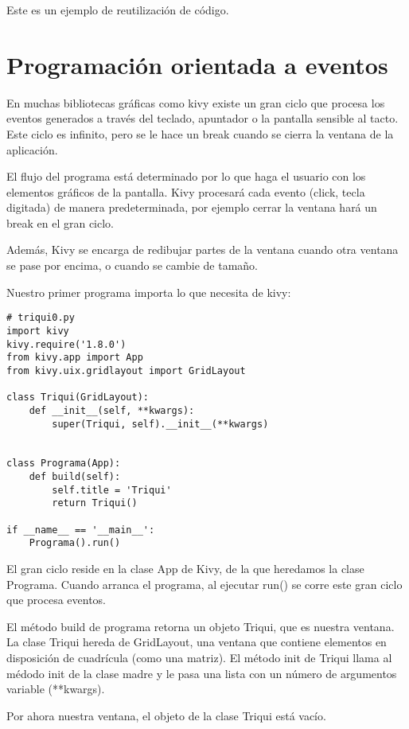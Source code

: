 Este es un ejemplo de reutilización de código.

\section{Programación orientada a eventos}

En muchas bibliotecas gráficas como kivy existe un gran ciclo que procesa
los eventos generados a través del teclado, apuntador o la pantalla
sensible al tacto. Este ciclo es infinito, pero se le hace un break
cuando se cierra la ventana de la aplicación.



El flujo del programa está determinado por lo que haga el usuario con
los elementos gráficos de la pantalla. Kivy procesará cada evento (click,
tecla digitada) de manera predeterminada, por ejemplo cerrar la
ventana hará un break en el gran ciclo.

Además, Kivy se encarga de redibujar partes de la ventana cuando otra
ventana se pase por encima, o cuando se cambie de tamaño.

Nuestro primer programa importa lo que necesita de kivy:

\beforeverb
\begin{verbatim}
# triqui0.py
import kivy
kivy.require('1.8.0')
from kivy.app import App
from kivy.uix.gridlayout import GridLayout

class Triqui(GridLayout):
    def __init__(self, **kwargs):
        super(Triqui, self).__init__(**kwargs)
   

class Programa(App):
    def build(self):
        self.title = 'Triqui'
        return Triqui()

if __name__ == '__main__':
    Programa().run()
\end{verbatim}
\afterverb

El gran ciclo reside en la clase App de Kivy, de la que heredamos la clase
Programa. Cuando arranca el programa, al ejecutar run() se corre este
gran ciclo que procesa eventos.

El método build de programa retorna un objeto Triqui, que es nuestra ventana.
La clase Triqui hereda de GridLayout, una ventana que contiene elementos
en disposición de cuadrícula (como una matriz). El método init de Triqui
llama al médodo init de la clase madre y le pasa una lista con un número
de argumentos variable (**kwargs). 

Por ahora nuestra ventana, el objeto de la clase Triqui está vacío.

